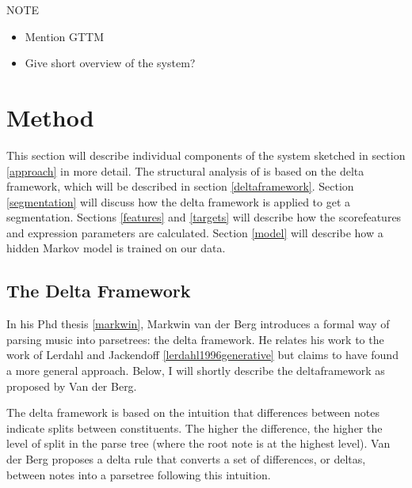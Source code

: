 \documentclass[a4paper,10pt]{article}
\begin{document}
NOTE
\begin{itemize}
\item Mention GTTM
\item Give short overview of the system?
\end{itemize}


\section{Method}

This section will describe individual components of the system sketched in section \ref{approach} in more detail. The structural analysis of is based on the delta framework, which will be described in section \ref{deltaframework}.  Section \ref{segmentation} will discuss how the delta framework is applied to get a segmentation. Sections \ref{features} and \ref{targets} will describe how the scorefeatures and expression parameters are calculated. Section \ref{model} will describe how a hidden Markov model is trained on our data.

\subsection{The Delta Framework}

In his Phd thesis \ref{markwin}, Markwin van der Berg introduces a formal way of parsing music into parsetrees: the delta framework. He relates his work to the work of Lerdahl and Jackendoff \ref{lerdahl1996generative} but claims to have found a more general approach. Below, I will shortly describe the deltaframework as proposed by Van der Berg.

The delta framework is based on the intuition that differences between notes indicate splits between constituents. The higher the difference, the higher the level of split in the parse tree (where the root note is at the highest level). Van der Berg proposes a delta rule that converts a set of differences, or deltas, between notes into a parsetree following this intuition. 
\end{document}
